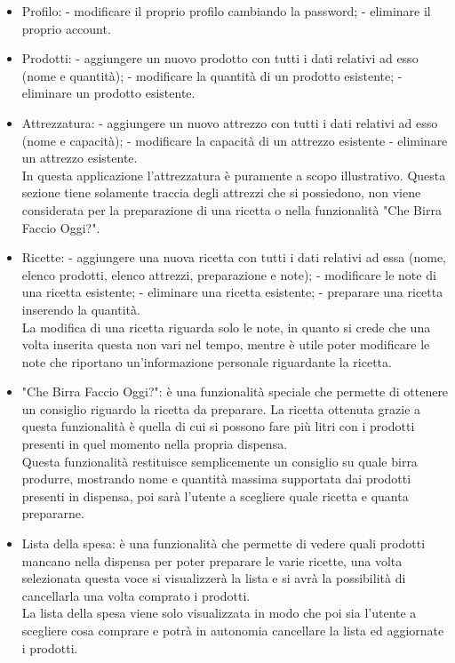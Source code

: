 \documentclass[a4paper, titlepage]{article}
\begin{document}
\begin{itemize}
    \item Profilo:
        \subitem - modificare il proprio profilo cambiando la password;
        \subitem - eliminare il proprio account.
    \item Prodotti:
        \subitem - aggiungere un nuovo prodotto con tutti i dati relativi ad esso (nome e quantità);
        \subitem - modificare la quantità di un prodotto esistente;
        \subitem - eliminare un prodotto esistente.
    \item Attrezzatura:
        \subitem - aggiungere un nuovo attrezzo con tutti i dati relativi ad esso (nome e capacità);
        \subitem - modificare la capacità di un attrezzo esistente
        \subitem - eliminare un attrezzo esistente.\\
        In questa applicazione l'attrezzatura è puramente a scopo illustrativo. Questa sezione tiene solamente traccia degli attrezzi che si possiedono, non viene considerata per la preparazione di una ricetta o nella funzionalità "Che Birra Faccio Oggi?".
    \item Ricette:
        \subitem - aggiungere una nuova ricetta con tutti i dati relativi ad essa (nome, elenco prodotti, elenco attrezzi, preparazione e note);
        \subitem - modificare le note di una ricetta esistente;
        \subitem - eliminare una ricetta esistente;
        \subitem - preparare una ricetta inserendo la quantità.\\
        La modifica di una ricetta riguarda solo le note, in quanto si crede che una volta inserita questa non vari nel tempo, mentre è utile poter modificare le note che riportano un'informazione personale riguardante la ricetta.
    \item "Che Birra Faccio Oggi?":
        \subitem è una funzionalità speciale che permette di ottenere un consiglio riguardo la ricetta da preparare. La ricetta ottenuta grazie a questa funzionalità è quella di cui si possono fare più litri con i prodotti presenti in quel momento nella propria dispensa.\\
        Questa funzionalità restituisce semplicemente un consiglio su quale birra produrre, mostrando nome e quantità massima supportata dai prodotti presenti in dispensa, poi sarà l'utente a scegliere quale ricetta e quanta prepararne.
    \item Lista della spesa:
        \subitem è una funzionalità che permette di vedere quali prodotti mancano nella dispensa per poter preparare le varie ricette, una volta selezionata questa voce si visualizzerà la lista e si avrà la possibilità di cancellarla una volta comprato i prodotti.\\
        La lista della spesa viene solo visualizzata in modo che poi sia l'utente a scegliere cosa comprare e potrà in autonomia cancellare la lista ed aggiornate i prodotti.
\end{itemize}
\end{document}
